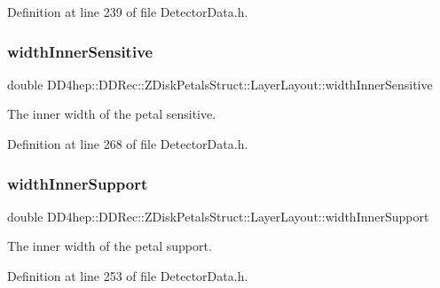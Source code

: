 Definition at line 239 of file Detector\+Data.\+h.

\hypertarget{struct_d_d4hep_1_1_d_d_rec_1_1_z_disk_petals_struct_1_1_layer_layout_a662855ee8d2089bb1d109fc51e9307f1}{}\label{struct_d_d4hep_1_1_d_d_rec_1_1_z_disk_petals_struct_1_1_layer_layout_a662855ee8d2089bb1d109fc51e9307f1} 
\subsubsection{\texorpdfstring{width\+Inner\+Sensitive}{widthInnerSensitive}}
{\footnotesize\ttfamily double D\+D4hep\+::\+D\+D\+Rec\+::\+Z\+Disk\+Petals\+Struct\+::\+Layer\+Layout\+::width\+Inner\+Sensitive}



The inner width of the petal sensitive. 



Definition at line 268 of file Detector\+Data.\+h.

\hypertarget{struct_d_d4hep_1_1_d_d_rec_1_1_z_disk_petals_struct_1_1_layer_layout_ad2a842725740bd0d2e2bc412f9e54f02}{}\label{struct_d_d4hep_1_1_d_d_rec_1_1_z_disk_petals_struct_1_1_layer_layout_ad2a842725740bd0d2e2bc412f9e54f02} 
\subsubsection{\texorpdfstring{width\+Inner\+Support}{widthInnerSupport}}
{\footnotesize\ttfamily double D\+D4hep\+::\+D\+D\+Rec\+::\+Z\+Disk\+Petals\+Struct\+::\+Layer\+Layout\+::width\+Inner\+Support}



The inner width of the petal support. 



Definition at line 253 of file Detector\+Data.\+h.

